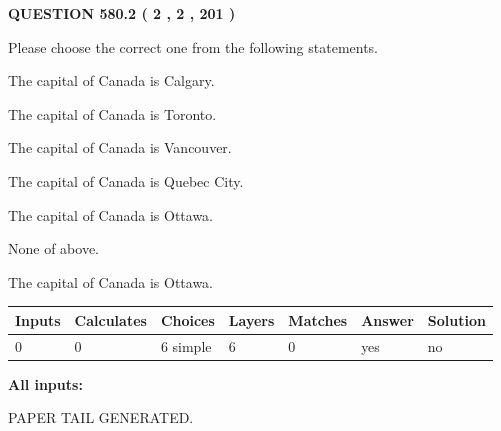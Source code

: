 \documentclass[12pt]{article}
\begin{document}
\vspace{0.2in}
  
{\textbf{\Large{QUESTION
580.2 
 ( 2 , 2 , 201 )
}}}
  
  
Please choose the correct one from the following statements.
 
 
The capital of Canada is Calgary.
 
 
The capital of Canada is Toronto.
 
 
The capital of Canada is Vancouver.
 
 
The capital of Canada is Quebec City.
 
 
The capital of Canada is Ottawa.
 
 
 None of above.
 
 
\noindent{}
 
 
The capital of Canada is Ottawa.
 
 
\noindent{}
 
 
   
   
   
   
\noindent\begin{tabular}{|l|l|l|l|l|l|l|}
 \hline
Inputs & Calculates & Choices & Layers & Matches & Answer & Solution \\ \hline
 0  & 
 0  & 
 6
  simple  
  & 
 6  & 
 0  & 
  yes & 
  no 
  \\ \hline
 \end{tabular}
   
   
   
   
\noindent{}
   
   
   
   
\noindent\vspace{0.1in}\hspace{-0.08in} {\textbf{\Large{All inputs: }}}
   
   
   
   
   
   
 \vspace{0.2in}
 
   
   
\vspace{2.0in} PAPER TAIL GENERATED.
   
\end{document}
